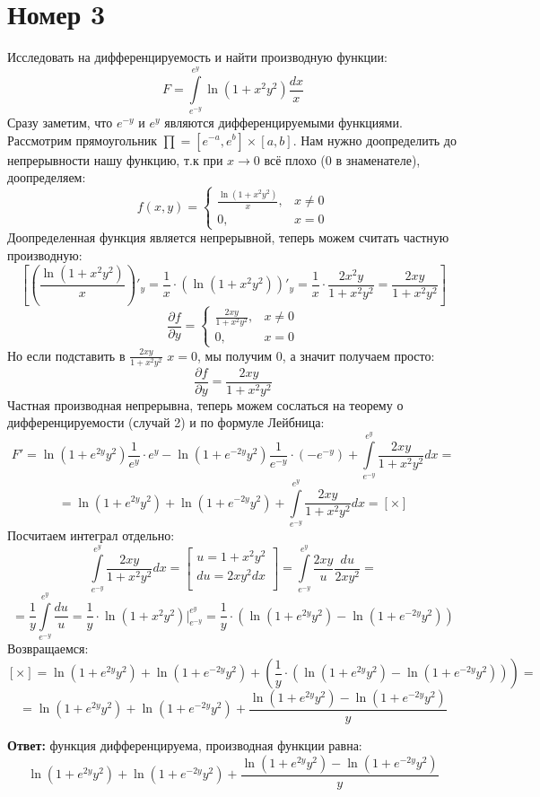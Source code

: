 \documentclass[a4paper,12pt]{article}
\begin{document}
\section*{Номер 3}
Исследовать на дифференцируемость и найти производную функции:
\[
F = \int\limits_{e^{-y}}^{e^y} \ln (1+ x^2y^2) \frac{dx}{x}
\]
Сразу заметим, что $e^{-y}$ и $e^y$ являются дифференцируемыми функциями. Рассмотрим прямоугольник $\prod = [e^{-a}, e^{b}] \times [a, b]$. Нам нужно доопределить до непрерывности нашу функцию, т.к при $x \rightarrow 0$ всё плохо (0 в знаменателе), доопределяем:
\[
f(x, y) = 
\begin{cases}
\frac{ \ln (1+ x^2y^2)}{x}, &x \neq 0 \\
0, &x = 0
\end{cases}
\]
Доопределенная функция является непрерывной, теперь можем считать частную производную:
\[
\left[
\left( \frac{ \ln (1+ x^2y^2)}{x} \right)'_y = 
\frac{1}{x} \cdot \left( \ln (1+ x^2y^2) \right)'_y =
\frac{1}{x} \cdot \frac{2x^2y}{1 +x^2y^2} = 
\frac{2xy}{1 + x^2y^2}
\right]
\]
\[
\frac{\partial f}{\partial y} = 
\begin{cases}
\frac{2xy}{1 + x^2y^2}, &x \neq 0 \\
0, &x = 0
\end{cases}
\]
Но если подставить в $\frac{2xy}{1 + x^2y^2}$ $x = 0$, мы получим 0, а значит получаем просто:
\[
\frac{\partial f}{\partial y} = 
\frac{2xy}{1 + x^2y^2}
\]
Частная производная непрерывна, теперь можем сослаться на теорему о дифференцируемости (случай 2) и по формуле Лейбница:
\[
F' = \ln \left(1 + e^{2y}y^2 \right) \frac{1}{e^y} \cdot  e^y - \ln \left( 1 + e^{-2y}y^2 \right) \frac{1}{e^{-y}} \cdot (-e^{-y}) + \int\limits_{e^{-y}}^{e^y} \frac{2xy}{1 + x^2y^2} dx =
\]
\[
=
\ln(1 + e^{2y} y^2) + \ln(1 + e^{-2y} y^2 ) + \int\limits_{e^{-y}}^{e^y} \frac{2xy}{1 + x^2y^2} dx = 
[\times]
\]
Посчитаем интеграл отдельно:
\[
\int\limits_{e^{-y}}^{e^y} \frac{2xy}{1 + x^2y^2} dx = 
\begin{bmatrix}
u = 1 + x^2y^2 \\
du = 2xy^2dx \\
\end{bmatrix} =
\int\limits_{e^{-y}}^{e^y} \frac{2xy}{u} \frac{du}{2xy^2} = 
\]
\[
= 
\frac{1}{y} \int\limits_{e^{-y}}^{e^y} \frac{du}{u} = 
\frac{1}{y} \cdot \ln(1 + x^2y^2) \Bigg|^{e^y}_{e^{-y}} =
\frac{1}{y} \cdot \left(  \ln(1 + e^{2y}y^2)  -  \ln(1 + e^{-2y}y^2)  \right)
\]
Возвращаемся:
\[
[\times] = 
\ln(1 + e^{2y} y^2) + \ln(1 + e^{-2y} y^2 ) + \left( \frac{1}{y} \cdot \left(  \ln(1 + e^{2y}y^2)  -  \ln(1 + e^{-2y}y^2)  \right) \right) =
\]
\[
=
\ln(1 + e^{2y} y^2) + \ln(1 + e^{-2y} y^2 )  + \frac{ \ln(1 + e^{2y}y^2) -  \ln(1 + e^{-2y}y^2)}{y}
\]
\begin{center}
\textbf{Ответ: } 
функция дифференцируема, производная функции равна:
\[
\ln(1 + e^{2y} y^2) + \ln(1 + e^{-2y} y^2 )  + \frac{ \ln(1 + e^{2y}y^2) -  \ln(1 + e^{-2y}y^2)}{y}
\]
\end{center}
\clearpage
\end{document}
